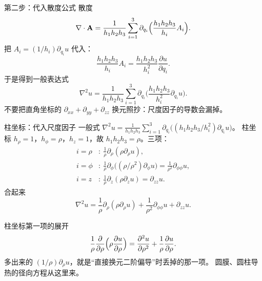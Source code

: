 \documentclass[fontset=windows, chinese, 10pt, xcolor=dvipsnames]{beamer}
\begin{document}
\begin{frame}{第二步：代入散度公式}
  散度
  \begin{equation*}
    \nabla\cdot\mathbf{A}
    =\frac{1}{h_1 h_2 h_3}
      \sum_{i=1}^{3}
      \partial_{q_i}
      \Bigl(\frac{h_1 h_2 h_3}{h_i}A_i\Bigr).
  \end{equation*}
  把 $A_i=(1/h_i)\partial_{q_i}u$ 代入：
  \begin{equation*}
    \frac{h_1 h_2 h_3}{h_i}A_i
    =\frac{h_1 h_2 h_3}{h_i^2}\frac{\partial u}{\partial q_i}.
  \end{equation*}
  于是得到一般表达式
  \begin{equation*}
    \boxed{\displaystyle
      \nabla^2 u
      =\frac{1}{h_1 h_2 h_3}
        \sum_{i=1}^{3}
        \partial_{q_i}
        \Biggl(\frac{h_1 h_2 h_3}{h_i^2}\partial_{q_i}u\Biggr).}
  \end{equation*}
  不要把直角坐标的 $\partial_{xx}+\partial_{yy}+\partial_{zz}$ 换元照抄：尺度因子的导数会漏掉。
\end{frame}

\begin{frame}{柱坐标：代入尺度因子}
  \small
  一般式
  $\nabla^2 u
  =\frac{1}{h_1 h_2 h_3}
    \sum_{i=1}^{3}
    \partial_{q_i}
    \bigl((h_1 h_2 h_3/h_i^2)\partial_{q_i}u\bigr)$。
  柱坐标 $h_{\rho}=1$，$h_{\phi}=\rho$，$h_z=1$，故 $h_1 h_2 h_3=\rho$。三项：
  \begin{align*}
    i=\rho &\colon\
      \frac{1}{\rho}\partial_{\rho}(\rho\partial_{\rho}u),\\
    i=\phi &\colon\
      \frac{1}{\rho}\partial_{\phi}\bigl((\rho/\rho^2)\partial_{\phi}u\bigr)
      =\frac{1}{\rho^2}\partial_{\phi\phi}u,\\
    i=z &\colon\
      \frac{1}{\rho}\partial_z(\rho\partial_z u)
      =\partial_{zz}u.
  \end{align*}
  合起来
  \begin{equation*}
    \boxed{\displaystyle
      \nabla^2 u
      =\frac{1}{\rho}\partial_{\rho}(\rho\partial_{\rho}u)
        +\frac{1}{\rho^2}\partial_{\phi\phi}u
        +\partial_{zz}u.}
  \end{equation*}
\end{frame}

\begin{frame}{柱坐标第一项的展开}
  \begin{equation*}
    \frac{1}{\rho}\frac{\partial}{\partial\rho}
      \Bigl(\rho\frac{\partial u}{\partial\rho}\Bigr)
    =\frac{\partial^2 u}{\partial\rho^2}
      +\frac{1}{\rho}\frac{\partial u}{\partial\rho}.
  \end{equation*}
  多出来的 $(1/\rho)\partial_{\rho}u$，就是“直接换元二阶偏导”时丢掉的那一项。
  圆膜、圆柱导热的径向方程从这里来。
\end{frame}
\end{document}
